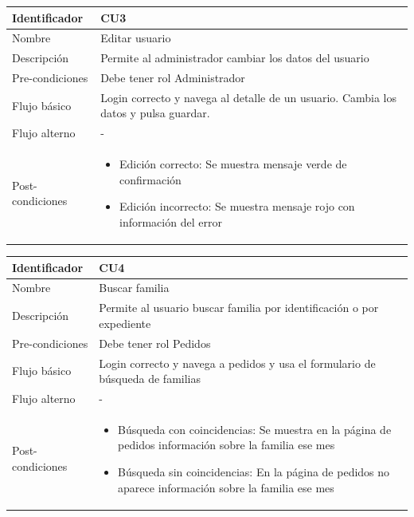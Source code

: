 \vspace{1em}
\par
\begin{tabular}{||p{3cm}|p{11cm}||} 
\hline
Identificador & CU3 \\ [0.5ex] 
\hline\hline
Nombre & Editar usuario \\ 
\hline
Descripción & Permite al administrador cambiar los datos del usuario \\
\hline
Pre-condiciones & Debe tener rol Administrador \\
\hline
Flujo básico & Login correcto y navega al detalle de un usuario. Cambia los datos y pulsa guardar. \\
\hline
Flujo alterno & - \\
\hline
Post-condiciones &
\begin{itemize}
    \item Edición correcto: Se muestra mensaje verde de confirmación
    \item Edición incorrecto: Se muestra mensaje rojo con información del error
\end{itemize} \\
\hline
\end{tabular}

\vspace{1em}
\par
\begin{tabular}{||p{3cm}|p{11cm}||} 
\hline
Identificador & CU4 \\ [0.5ex] 
\hline\hline
Nombre & Buscar familia \\ 
\hline
Descripción & Permite al usuario buscar familia por identificación o por expediente \\
\hline
Pre-condiciones & Debe tener rol Pedidos \\
\hline
Flujo básico & Login correcto y navega a pedidos y usa el formulario de búsqueda de familias \\
\hline
Flujo alterno & - \\
\hline
Post-condiciones &
\begin{itemize}
    \item Búsqueda con coincidencias: Se muestra en la página de pedidos información sobre la familia ese mes
    \item Búsqueda sin coincidencias: En la página de pedidos no aparece información sobre la familia ese mes
\end{itemize} \\
\hline
\end{tabular}


